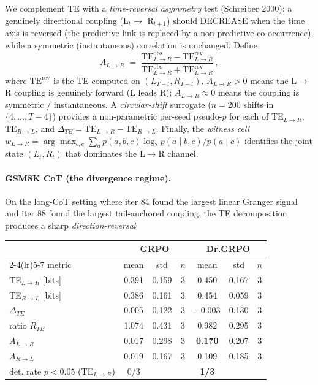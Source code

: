 We complement TE with a \emph{time-reversal asymmetry} test
(Schreiber 2000): a genuinely directional coupling (L$_t \to$
R$_{t+1}$) should DECREASE when the time axis is reversed (the
predictive link is replaced by a non-predictive co-occurrence), while
a symmetric (instantaneous) correlation is unchanged.  Define
\[
A_{L\to R} \;=\;
   \frac{\mathrm{TE}^{\mathrm{obs}}_{L\to R} - \mathrm{TE}^{\mathrm{rev}}_{L\to R}}
        {\mathrm{TE}^{\mathrm{obs}}_{L\to R} + \mathrm{TE}^{\mathrm{rev}}_{L\to R}} \,,
\]
where $\mathrm{TE}^{\mathrm{rev}}$ is the TE computed on
$(L_{T-t}, R_{T-t})$.  $A_{L\to R} > 0$ means the L$\to$R coupling is
genuinely forward (L leads R); $A_{L\to R} \approx 0$ means the
coupling is symmetric / instantaneous.  A \emph{circular-shift}
surrogate ($n=200$ shifts in $\{4, \ldots, T-4\}$) provides a
non-parametric per-seed pseudo-$p$ for each of TE$_{L\to R}$,
TE$_{R\to L}$, and $\Delta_{TE} = \mathrm{TE}_{L\to R} -
\mathrm{TE}_{R\to L}$.  Finally, the \emph{witness cell}
$w_{L\to R} = \arg\max_{b,c} \sum_a p(a,b,c) \log_2 p(a\mid b,c) /
p(a\mid c)$ identifies the joint state $(L_t, R_t)$ that dominates
the L$\to$R channel.

\paragraph{GSM8K CoT (the divergence regime).}
On the long-CoT setting where iter 84 found the largest linear
Granger signal and iter 88 found the largest tail-anchored coupling,
the TE decomposition produces a sharp \emph{direction-reversal}:

\noindent
\begin{tabular}{lcccccc}
 & \multicolumn{3}{c}{GRPO} & \multicolumn{3}{c}{Dr.GRPO} \\
\cmidrule(lr){2-4}\cmidrule(lr){5-7}
metric & mean & std & $n$ & mean & std & $n$\\\hline
TE$_{L\to R}$ [bits] & 0.391 & 0.159 & 3 & 0.450 & 0.167 & 3\\
TE$_{R\to L}$ [bits] & 0.386 & 0.161 & 3 & 0.454 & 0.059 & 3\\
$\Delta_{TE}$         & 0.005 & 0.122 & 3 & $-$0.003 & 0.130 & 3\\
ratio $R_{TE}$        & 1.074 & 0.431 & 3 & 0.982 & 0.295 & 3\\
$A_{L\to R}$          & 0.017 & 0.298 & 3 & \textbf{0.170} & 0.207 & 3\\
$A_{R\to L}$          & 0.019 & 0.167 & 3 & 0.109 & 0.185 & 3\\
det. rate $p<0.05$ (TE$_{L\to R}$) & 0/3 & & & \textbf{1/3} & &\\
\end{tabular}

